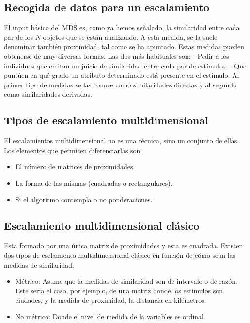 \documentclass[]{article}
\providecommand{\tightlist}{%
  \setlength{\itemsep}{0pt}\setlength{\parskip}{0pt}}
\begin{document}
\subsection{Recogida de datos para un
escalamiento}\label{recogida-de-datos-para-un-escalamiento}

 El input básico del MDS es, como ya hemos señalado, la similaridad
entre cada par de los \(N\) objetos que se están analizando. A esta
medida, se la suele denominar también proximidad, tal como se ha
apuntado. Estas medidas pueden obtenerse de muy diversas formas. Las dos
más habituales son: - Pedir a los individuos que emitan un juicio de
similaridad entre cada par de estímulos. - Que puntúen en qué grado un
atributo determinado está presente en el estímulo. Al primer tipo de
medidas se las conoce como similaridades directas y al segundo como
similaridades derivadas.

\subsection{Tipos de escalamiento
multidimensional}\label{tipos-de-escalamiento-multidimensional}

 El escalamientos multidimensional no es una técnica, sino un conjunto
de ellas. Los elementos que permiten diferenciarlas son:

\begin{itemize}
\tightlist
\item
  El número de matrices de proximidades.
\item
  La forma de las mismas (cuadradas o rectangulares).
\item
  Si el algoritmo contempla o no ponderaciones. 
\end{itemize}

\subsection{Escalamiento multidimensional
clásico}\label{escalamiento-multidimensional-cluxe1sico}

 Esta formado por una única matriz de proximidades y esta es cuadrada.
Existen dos tipos de esclamiento multidimensional clásico en función de
cómo sean las medidas de similaridad.

\begin{itemize}
\item
  Métrico: Asume que la medidas de similaridad son de intervalo o de
  razón. Este seria el caso, por ejemplo, de una matriz donde los
  estímulos son ciudades, y la medida de proximidad, la distancia en
  kilémetros.
\item
  No métrico: Donde el nivel de medida de la variables es ordinal. 
\end{itemize}
\end{document}
